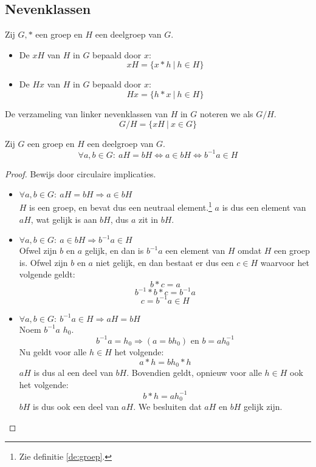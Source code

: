 \documentclass[main.tex]{subfiles}
\begin{document}
\subsection{Nevenklassen}
\label{sec:nevenklassen}

\begin{de}
  \label{de:nevenklassen}
  Zij $G,*$ een groep en $H$ een deelgroep van $G$.
  \begin{itemize}
  \item De  $xH$ van $H$ in $G$ bepaald door $x$:
    \[ xH = \{ x * h\ |\ h \in H \} \]
  \item De  $Hx$ van $H$ in $G$ bepaald door $x$:
    \[ Hx = \{ h * x\ |\ h \in H \} \]
  \end{itemize}
  De verzameling van linker nevenklassen van $H$ in $G$ noteren we als $G/H$.
  \[ G/H = \{ xH\ |\ x \in G \} \]
\end{de}

\begin{ei}
  \label{ei:linker-nevenklasse-eig}
  Zij $G$ een groep en $H$ een deelgroep van $G$.
  \[ \forall a,b \in G:\ aH = bH \Leftrightarrow a \in bH \Leftrightarrow b^{-1}a \in H \]

  \begin{proof}
    Bewijs door circulaire implicaties.
    \begin{itemize}
    \item $\forall a,b \in G:\ aH = bH \Rightarrow a \in bH$\\
      $H$ is een groep, en bevat dus een neutraal element.\footnote{Zie definitie \ref{de:groep}.}
      $a$ is dus een element van $aH$, wat gelijk is aan $bH$, dus $a$ zit in $bH$.
    \item $\forall a,b \in G:\ a \in bH \Rightarrow b^{-1}a \in H$\\
      Ofwel zijn $b$ en $a$ gelijk, en dan is $b^{-1}a$ een element van $H$ omdat $H$ een groep is.
      Ofwel zijn $b$ en $a$ niet gelijk, en dan bestaat er dus een $c \in H$ waarvoor het volgende geldt:
      \[ b*c = a\]
      \[ b^{-1}*b*c = b^{-1}a\]
      \[ c = b^{-1}a \in H \]
    \item $\forall a,b \in G:\ b^{-1}a \in H\Rightarrow aH = bH$\\
      Noem $b^{-1}a$ $h_{0}$.
      \[ b^{-1}a = h_{0} \Rightarrow (a = bh_{0}) \text { en } b = a h_{0}^{-1} \]
      Nu geldt voor alle $h \in H$ het volgende:
      \[ a * h = bh_{0}*h \]
      $aH$ is dus al een deel van $bH$.
      Bovendien geldt, opnieuw voor alle $h \in H$ ook het volgende:
      \[ b * h = ah_{0}^{-1} \]
      $bH$ is dus ook een deel van $aH$.
      We besluiten dat $aH$ en $bH$ gelijk zijn.
   \end{itemize}
  \end{proof}
\end{ei}
\end{document}

